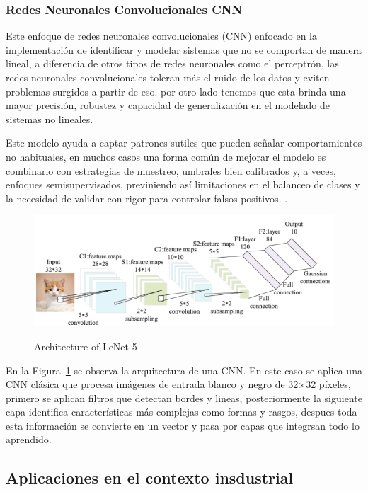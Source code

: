 \documentclass[11pt,a4paper,spanish]{book}
\numberwithin{equation}{chapter}
\numberwithin{figure}{chapter}
\begin{document}
\subsubsection{Redes Neuronales Convolucionales CNN}


Este enfoque de redes neuronales convolucionales (CNN) enfocado en la implementación 
de identificar y modelar sistemas que no se comportan de manera lineal, a diferencia 
de otros tipos de redes neuronales como el perceptrón, las redes neuronales 
convolucionales toleran más el ruido de los datos y eviten problemas surgidos a 
partir de eso. por otro lado tenemos que esta brinda una mayor precisión, robustez y 
capacidad de generalización en el modelado de sistemas no lineales. 
\cite{LopezPacheco2017}


Este modelo ayuda a captar patrones sutiles que pueden señalar comportamientos no 
habituales, en muchos casos una forma común de mejorar el modelo es combinarlo con 
estrategias de muestreo, umbrales bien calibrados y, a veces, enfoques semisupervisados, 
previniendo así limitaciones en el balanceo de clases y la necesidad de validar con 
rigor para controlar falsos positivos. \cite{ameijeiras2021algoritmos}.


\begin{figure}[h]
    \caption{Architecture of LeNet-5  \protect\cite{Zhao2024review}}
    \centering
    \includegraphics[width=1.0\textwidth]{media/lenet-o5.png}
    \label{fig:figLenet}
\end{figure}


En la Figura~\ref{fig:figLenet} se observa la arquitectura de una CNN. En este caso se 
aplica una CNN clásica que procesa imágenes de entrada blanco y negro de 32×32 píxeles, 
primero se aplican filtros que detectan bordes y lineas, posteriormente la siguiente 
capa identifica características más complejas como formas y rasgos, despues toda esta 
información se convierte en un vector y pasa por capas que integrsan todo lo aprendido. 
\cite{Zhao2024review}


\subsection{Aplicaciones en el contexto insdustrial} 
\end{document}
